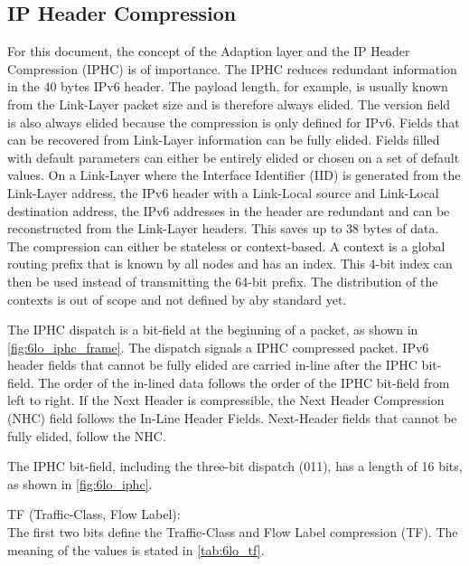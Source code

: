 \subsection{IP Header Compression}
\label{sec:iphc}

For this document, the concept of the Adaption layer and the IP Header Compression (IPHC) is of importance.
The IPHC reduces redundant information in the 40 bytes IPv6 header.
The payload length, for example, is usually known from the Link-Layer packet size and is therefore always elided.
The version field is also always elided because the compression is only defined for IPv6.
Fields that can be recovered from Link-Layer information can be fully elided.
Fields filled with default parameters can either be entirely elided or chosen on a set of default values.
On a Link-Layer where the Interface Identifier (IID) is generated from the Link-Layer address,
the IPv6 header with a Link-Local source and Link-Local destination address, the IPv6 addresses in the header are
redundant and can be reconstructed from the Link-Layer headers.
This saves up to 38 bytes of data.
The compression can either be stateless or context-based.
A context is a global routing prefix that is known by all nodes and has an index.
This 4-bit index can then be used instead of transmitting the 64-bit prefix.
The distribution of the contexts is out of scope and not defined by aby standard yet.



The IPHC dispatch is a bit-field at the beginning of a packet, as shown in \autoref{fig:6lo_iphc_frame}.
The dispatch signals a IPHC compressed packet.
IPv6 header fields that cannot be fully elided are carried in-line after the IPHC bit-field.
The order of the in-lined data follows the order of the IPHC bit-field from left to right.
If the Next Header is compressible, the Next Header Compression (NHC) field follows the In-Line Header Fields.
Next-Header fields that cannot be fully elided, follow the NHC.



The IPHC bit-field, including the three-bit dispatch (011), has a length of 16 bits, as shown in \autoref{fig:6lo_iphc}.

TF (Traffic-Class, Flow Label):\\
The first two bits define the Traffic-Class and Flow Label compression (TF).
The meaning of the values is stated in \autoref{tab:6lo_tf}.

